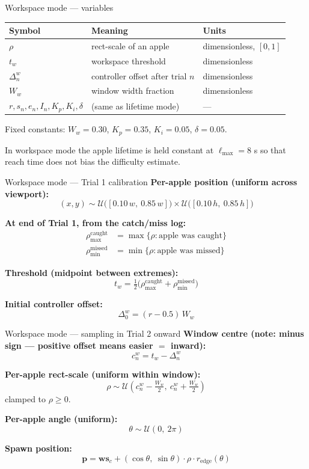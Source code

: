 \documentclass[10pt,aspectratio=169]{beamer}
\newcommand{\target}{r}
\newcommand{\obs}{s_n}
\newcommand{\err}{e_n}
\newcommand{\Kp}{K_p}
\newcommand{\Ki}{K_i}
\newcommand{\Iaccum}{I_n}
\newcommand{\dband}{\delta}
\begin{document}
\begin{frame}{Workspace mode --- variables}
\begin{center}
\begin{tabular}{lll}
\toprule
Symbol & Meaning & Units \\
\midrule
$\rho$ & rect-scale of an apple & dimensionless, $[0,1]$ \\
$t_w$ & workspace threshold & dimensionless \\
$\Delta_n^w$ & controller offset after trial $n$ & dimensionless \\
$W_w$ & window width fraction & dimensionless \\
$\target,\obs,\err,\Iaccum,\Kp,\Ki,\dband$ & (same as lifetime mode) & --- \\
\bottomrule
\end{tabular}
\end{center}

\vspace{0.5em}
Fixed constants: $W_w = 0.30$, $\Kp = 0.35$, $\Ki = 0.05$, $\dband = 0.05$.

In workspace mode the apple lifetime is held constant at $\ell_{\max} = 8$ s so that reach time does not bias the difficulty estimate.
\end{frame}

\begin{frame}{Workspace mode --- Trial 1 calibration}
\textbf{Per-apple position (uniform across viewport):}
\[
(x, y) \sim \mathcal{U}\bigl([0.10\,w,\ 0.85\,w]\bigr) \times \mathcal{U}\bigl([0.10\,h,\ 0.85\,h]\bigr)
\]

\textbf{At end of Trial 1, from the catch/miss log:}
\begin{align*}
\rho_{\max}^{\text{caught}} &= \max \{\rho : \text{apple was caught}\} \\
\rho_{\min}^{\text{missed}} &= \min \{\rho : \text{apple was missed}\}
\end{align*}

\textbf{Threshold (midpoint between extremes):}
\[
\boxed{t_w = \tfrac{1}{2}\bigl(\rho_{\max}^{\text{caught}} + \rho_{\min}^{\text{missed}}\bigr)}
\]

\textbf{Initial controller offset:}
\[
\Delta_0^w = (\target - 0.5)\, W_w
\]
\end{frame}

\begin{frame}{Workspace mode --- sampling in Trial 2 onward}
\textbf{Window centre (note: minus sign --- positive offset means easier $=$ inward):}
\[
c_n^w = t_w - \Delta_n^w
\]

\textbf{Per-apple rect-scale (uniform within window):}
\[
\rho \sim \mathcal{U}\!\left( c_n^w - \tfrac{W_w}{2},\ c_n^w + \tfrac{W_w}{2} \right)
\]
clamped to $\rho \ge 0$.

\textbf{Per-apple angle (uniform):}
\[
\theta \sim \mathcal{U}(0,\ 2\pi)
\]

\textbf{Spawn position:}
\[
\mathbf{p} = \mathbf{ws}_c + (\cos\theta,\ \sin\theta) \cdot \rho \cdot r_{\text{edge}}(\theta)
\]
\end{frame}
\end{document}
